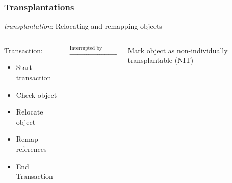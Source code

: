 \documentclass{beamer}
\newcommand{\linespace}{\vskip 0.25cm}
\begin{document}
\begin{frame}

\frametitle{Transplantations}

\emph{transplantation}: Relocating and remapping objects

\linespace
\linespace

\begin{columns}
\begin{column}{0.33\textwidth}

Transaction:
\begin{itemize}
\item Start transaction
\item Check object
\item Relocate object
\item Remap references
\item End Transaction
\end{itemize}

\end{column}
\begin{column}{0.32\textwidth}

$\xrightarrow{\text{Interrupted by application}}$

\end{column}
\begin{column}{0.3\textwidth}

Mark object as non-individually transplantable (NIT)

\end{column}
\end{columns}

\end{frame}
\end{document}
